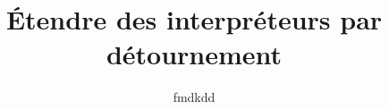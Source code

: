 

\newcommand{\titlefr}{Étendre des interpréteurs par détournement}
\newcommand{\subtitlefr}{Comment j'ai appris à ne plus m'en faire et à aimer le code}
\newcommand{\titleen}{Extending interpreters by diversion}

\title{\titlefr}
\author{fmdkdd}









\frontmatter
{}
\pagestyle{empty}
\tableofcontents*
\clearpage
\restoregeometry


\pagestyle{headings}
\mainmatter


\backmatter

\printbibliography
\restoregeometry



